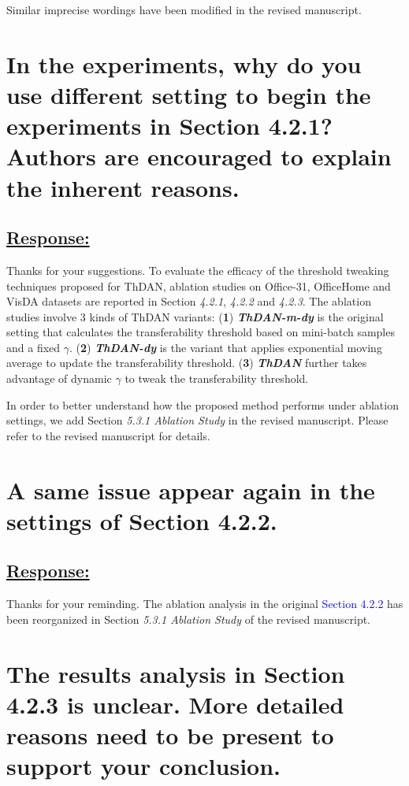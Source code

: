 Similar imprecise wordings have been modified in the revised manuscript.


\section{In the experiments, why do you use different setting to begin the experiments in Section 4.2.1? Authors are encouraged to explain the inherent reasons.}
\subsection*{\underline{\textbf{Response:}}}

Thanks for your suggestions.
To evaluate the efficacy of the threshold tweaking techniques proposed for ThDAN, ablation studies on Office-31, OfficeHome and VisDA datasets are reported in Section \textit{4.2.1}, \textit{4.2.2} and \textit{4.2.3}.
The ablation studies involve 3 kinds of ThDAN variants:
(\textbf{1}) \textit{\textbf{ThDAN-m-dy}} is the original setting that calculates the transferability threshold based on mini-batch samples and a fixed $\gamma$.
(\textbf{2}) \textit{\textbf{ThDAN-dy}} is the variant that applies exponential moving average to update the transferability threshold.
(\textbf{3}) \textit{\textbf{ThDAN}} further takes advantage of dynamic $\gamma$ to tweak the transferability threshold.

In order to better understand how the proposed method performs under ablation settings, we add Section \textit{5.3.1 Ablation Study} in the revised manuscript.
Please refer to the revised manuscript for details.


\section{A same issue appear again in the settings of Section 4.2.2.}
\subsection*{\underline{\textbf{Response:}}}

Thanks for your reminding.
The ablation analysis in the original \textcolor{blue}{Section 4.2.2} has been reorganized in Section \textit{5.3.1 Ablation Study} of the revised manuscript.


\section{The results analysis in Section 4.2.3 is unclear. More detailed reasons need to be present to support your conclusion.}
